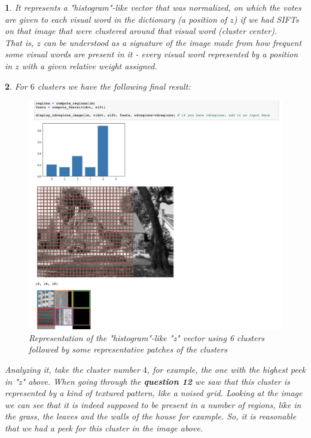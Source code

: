 \documentclass[10pt]{article} %
\theoremstyle{question-style}
\newtheorem{answer}{\arabic{answer}}
\begin{document}
\begin{flushleft}
\begin{answer} 
It represents a "histogram"-like vector that was normalized, on which the votes are given to each visual word in the dictionary (a position of $z$) if we had SIFTs on that image that were clustered around that visual word (cluster center). \\

\quad That is, $z$ can be understood as a signature of the image made from how frequent some visual words are present in it - every visual word represented by a position in $z$ with a given relative weight assigned.
\end{answer}

\begin{answer} %

For $6$ clusters we have the following final result:

\begin{figure}[H]
	\begin{center}
		\includegraphics[scale=0.6]{final.png} %
	\end{center}
	\caption{Representation of the "histogram"-like "z" vector using 6 clusters followed by some representative patches of the clusters}
	\label{fig:final}
\end{figure}

\quad Analyzing it, take the cluster number $4$, for example, the one with the highest peek in "z" above. When going through the \textbf{question 12} we saw that this cluster is represented by a kind of textured pattern, like a noised grid. Looking at the image we can see that it is indeed supposed to be present in a number of regions, like in the grass, the leaves and the walls of the house for example. So, it is reasonable that we had a peek for this cluster in the image above.


\end{answer}
\end{flushleft}
\end{document}
